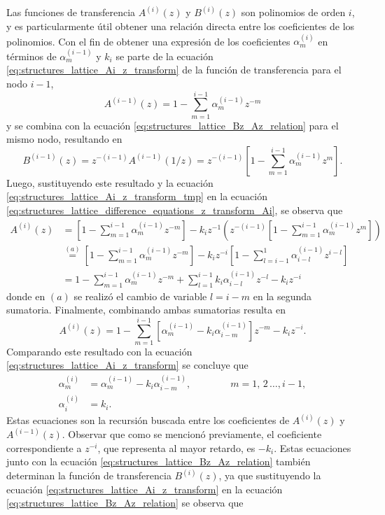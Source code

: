 \documentclass[a4paper]{report}
\begin{document}
Las funciones de transferencia \(A^{(i)}(z)\) y \(B^{(i)}(z)\) son polinomios de orden \(i\), y es particularmente útil obtener una relación directa entre los coeficientes de los polinomios. Con el fin de obtener una expresión de los coeficientes \(\alpha^{(i)}_m\) en términos de \(\alpha^{(i-1)}_m\) y \(k_i\) se parte de la ecuación \ref{eq:structures_lattice_Ai_z_transform} de la función de transferencia para el nodo \(i-1\),
\begin{equation}\label{eq:structures_lattice_Ai_z_transform_tmp}
 A^{(i-1)}(z)=1-\sum_{m=1}^{i-1}\alpha^{(i-1)}_mz^{-m}
\end{equation}
y se combina con la ecuación \ref{eq:structures_lattice_Bz_Az_relation} para el mismo nodo, resultando en
\[
 B^{(i-1)}(z)=z^{-(i-1)}A^{(i-1)}(1/z)=z^{-(i-1)}\left[1-\sum_{m=1}^{i-1}\alpha^{(i-1)}_mz^{m}\right].
\]
Luego, sustituyendo este resultado y la ecuación \ref{eq:structures_lattice_Ai_z_transform_tmp} en la ecuación \ref{eq:structures_lattice_difference_equations_z_transform_Ai}, se observa que 
\begin{align*}
 A^{(i)}(z)&=\left[1-\sum_{m=1}^{i-1}\alpha^{(i-1)}_mz^{-m}\right]-k_iz^{-1}\left(z^{-(i-1)}\left[1-\sum_{m=1}^{i-1}\alpha^{(i-1)}_mz^{m}\right]\right)\\
  &\overset{(a)}{=}\left[1-\sum_{m=1}^{i-1}\alpha^{(i-1)}_mz^{-m}\right]-k_iz^{-i}\left[1-\sum_{l=i-1}^{1}\alpha^{(i-1)}_{i-l}z^{i-l}\right]\\
  &=1-\sum_{m=1}^{i-1}\alpha^{(i-1)}_mz^{-m}+\sum_{l=1}^{i-1}k_i\alpha^{(i-1)}_{i-l}z^{-l}-k_iz^{-i}
\end{align*}
donde en \((a)\) se realizó el cambio de variable \(l=i-m\) en la segunda sumatoria. Finalmente, combinando ambas sumatorias resulta en
\[
 A^{(i)}(z)=1-\sum_{m=1}^{i-1}\left[\alpha^{(i-1)}_m-k_i\alpha^{(i-1)}_{i-m}\right]z^{-m}-k_iz^{-i}.
\]
Comparando este resultado con la ecuación \ref{eq:structures_lattice_Ai_z_transform} se concluye que 
\begin{equation}\label{eq:structures_lattice_alpha_recursion}
 \begin{aligned}
  \alpha^{(i)}_m&=\alpha^{(i-1)}_m-k_i\alpha^{(i-1)}_{i-m},\qquad\qquad m=1,\,2\,\dots,i-1,\\
  \alpha^{(i)}_i&=k_i.
 \end{aligned}
\end{equation}
Estas ecuaciones son la recursión buscada entre los coeficientes de \(A^{(i)}(z)\) y \(A^{(i-1)}(z)\). Observar que como se mencionó previamente, el coeficiente correspondiente a \(z^{-i}\), que representa al mayor retardo, es \(-k_i\). Estas ecuaciones junto con la ecuación \ref{eq:structures_lattice_Bz_Az_relation} también determinan la función de transferencia \(B^{(i)}(z)\), ya que sustituyendo la ecuación \ref{eq:structures_lattice_Ai_z_transform} en la ecuación \ref{eq:structures_lattice_Bz_Az_relation} se observa que 
\end{document}
